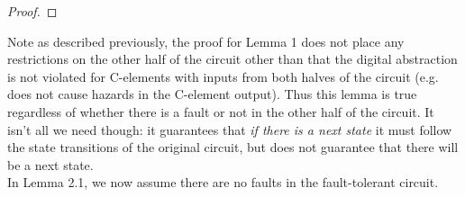 \documentclass[12pt]{report}
\begin{document}
\begin{proof}

\end{proof}
Note as described previously, the proof for Lemma 1 does not place any restrictions on the other half of the circuit other than that the digital abstraction is not violated for C-elements with inputs from both halves of the circuit (e.g. does not cause hazards in the C-element output).  Thus this lemma is true regardless of whether there is a fault or not in the other half of the circuit.  It isn't all we need though: it guarantees that {\em if there is a next state} it must follow the state transitions of the original circuit, but does not guarantee that there will be a next state.\\  %

In Lemma 2.1, we now assume there are no faults in the fault-tolerant circuit.
\end{document}
